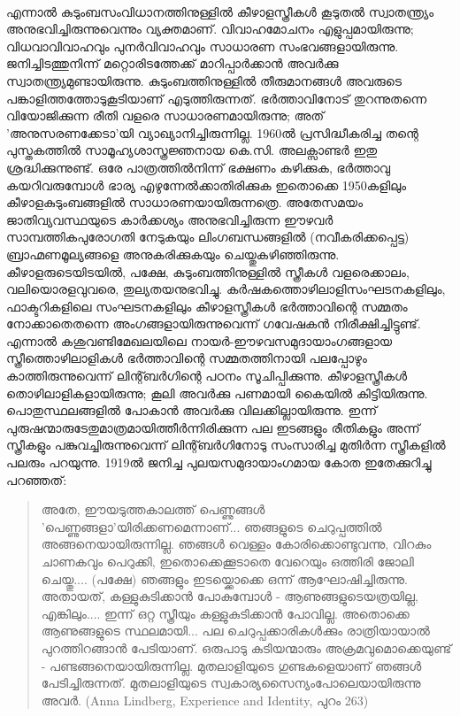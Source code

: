 \paragraph{}എന്നാൽ കുടുംബസംവിധാനത്തിനുള്ളിൽ കീഴാളസ്ത്രീകൾ കൂടുതൽ സ്വാതന്ത്ര്യം അനുഭവിച്ചിരുന്നുവെന്നും വ്യക്തമാണ്. വിവാഹമോചനം എളുപ്പമായിരുന്നു; വിധവാവിവാഹവും പുനർവിവാഹവും സാധാരണ സംഭവങ്ങളായിരുന്നു. ജനിച്ചിടത്തുനിന്ന് മറ്റൊരിടത്തേക്ക് മാറിപ്പാർക്കാൻ അവർക്കു സ്വാതന്ത്ര്യമുണ്ടായിരുന്നു. കുടുംബത്തിനുള്ളിൽ തീരുമാനങ്ങൾ അവരുടെ പങ്കാളിത്തത്തോടുകൂടിയാണ് എടുത്തിരുന്നത്. ഭർത്താവിനോട് തുറന്നുതന്നെ വിയോജിക്കുന്ന രീതി വളരെ സാധാരണമായിരുന്നു; അത് 'അനുസരണക്കേടാ'യി വ്യാഖ്യാനിച്ചിരുന്നില്ല. 1960ൽ പ്രസിദ്ധീകരിച്ച തന്റെ പുസ്തകത്തിൽ സാമൂഹ്യശാസ്ത്രജ്ഞനായ കെ.സി. അലക്സാണ്ടർ ഇതു ശ്രദ്ധിക്കുന്നുണ്ട്. ഒരേ പാത്രത്തിൽനിന്ന് ഭക്ഷണം കഴിക്കുക, ഭർത്താവു കയറിവരുമ്പോൾ ഭാര്യ എഴുന്നേൽക്കാതിരിക്കുക ഇതൊക്കെ 1950കളിലും കീഴാളകുടുംബങ്ങളിൽ സാധാരണയായിരുന്നത്രെ. അതേസമയം ജാതിവ്യവസ്ഥയുടെ കാർക്കശ്യം അനുഭവിച്ചിരുന്ന ഈഴവർ സാമ്പത്തികപുരോഗതി നേടുകയും ലിംഗബന്ധങ്ങളിൽ (നവീകരിക്കപ്പെട്ട) ബ്രാഹ്മണമൂല്യങ്ങളെ അനുകരിക്കുകയും ചെയ്തുകഴിഞ്ഞിരുന്നു. കീഴാളരുടെയിടയിൽ, പക്ഷേ, കുടുംബത്തിനുള്ളിൽ സ്ത്രീകൾ വളരെക്കാലം, വലിയൊരളവുവരെ, തുല്യതയനുഭവിച്ചു. കർഷകത്തൊഴിലാളിസംഘടനകളിലും, ഫാക്ടറികളിലെ സംഘടനകളിലും കീഴാളസ്ത്രീകൾ ഭർത്താവിന്റെ സമ്മതം നോക്കാതെതന്നെ അംഗങ്ങളായിരുന്നുവെന്ന് ഗവേഷകൻ നിരീക്ഷിച്ചിട്ടുണ്ട്. എന്നാൽ കശുവണ്ടിമേഖലയിലെ നായർ-ഈഴവസമുദായാംഗങ്ങളായ സ്ത്രീത്തൊഴിലാളികൾ ഭർത്താവിന്റെ സമ്മതത്തിനായി പലപ്പോഴും കാത്തിരുന്നുവെന്ന് ലിന്റ്ബർഗിന്റെ പഠനം സൂചിപ്പിക്കുന്നു. കീഴാളസ്ത്രീകൾ തൊഴിലാളികളായിരുന്നു; കൂലി അവർക്കു പണമായി കൈയിൽ കിട്ടിയിരുന്നു. പൊതുസ്ഥലങ്ങളിൽ പോകാൻ അവർക്കു വിലക്കില്ലായിരുന്നു. ഇന്ന് പുരുഷന്മാരുടേതുമാത്രമായിത്തീർന്നിരിക്കുന്ന പല ഇടങ്ങളും രീതികളും അന്ന് സ്ത്രീകളും പങ്കുവച്ചിരുന്നുവെന്ന് ലിന്റ്ബർഗിനോടു സംസാരിച്ച മുതിർന്ന സ്ത്രീകളിൽ പലരും പറയുന്നു. 1919ൽ ജനിച്ച പുലയസമുദായാംഗമായ കോത ഇതേക്കുറിച്ചു പറഞ്ഞത്:
\begin{quotation}
അതേ, ഈയടുത്തകാലത്ത് പെണ്ണുങ്ങൾ 'പെണ്ണുങ്ങളാ'യിരിക്കണമെന്നാണ്... ഞങ്ങളുടെ ചെറുപ്പത്തിൽ അങ്ങനെയായിരുന്നില്ല. ഞങ്ങൾ വെള്ളം കോരിക്കൊണ്ടുവന്നു, വിറകും ചാണകവും പെറുക്കി, ഇതൊക്കെക്കൂടാതെ വേറെയും ഒത്തിരി ജോലി ചെയ്തു.... (പക്ഷേ) ഞങ്ങളും ഇടയ്ക്കൊക്കെ ഒന്ന് ആഘോഷിച്ചിരുന്നു. അതായത്, കള്ളുകുടിക്കാൻ പോകുമ്പോൾ - ആണുങ്ങളുടെയത്രയില്ല, എങ്കിലും.... ഇന്ന് ഒറ്റ സ്ത്രീയും കള്ളുകുടിക്കാൻ പോവില്ല. അതൊക്കെ ആണുങ്ങളുടെ സ്ഥലമായി... പല ചെറുപ്പക്കാരികൾക്കും രാത്രിയായാൽ പുറത്തിറങ്ങാൻ പേടിയാണ്. ഒരുപാടു കുടിയന്മാരും അക്രമവുമൊക്കെയുണ്ട് - പണ്ടങ്ങനെയായിരുന്നില്ല. മുതലാളിയുടെ ഗുണ്ടകളെയാണ് ഞങ്ങൾ പേടിച്ചിരുന്നത്. മുതലാളിയുടെ സ്വകാര്യസൈന്യംപോലെയായിരുന്നു അവർ.
(Anna Lindberg, Experience and Identity, പുറം 263)
\end{quotation}
